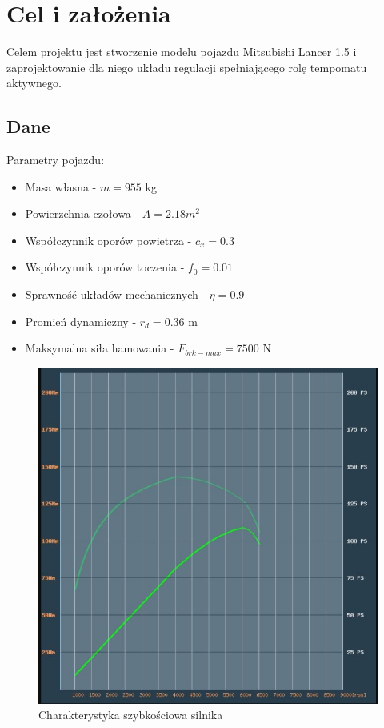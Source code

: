 \documentclass[12pt, a4paper, headings=normal]{article}
\begin{document}

\newpage

\tableofcontents

\newpage
\section{Cel i założenia}

Celem projektu jest stworzenie modelu pojazdu Mitsubishi Lancer 1.5 i zaprojektowanie 
dla niego układu regulacji spełniającego rolę tempomatu aktywnego.

\subsection{Dane}

Parametry pojazdu:
\begin{itemize}
	\item Masa własna - $m = 955$ kg
	\item Powierzchnia czołowa - $A = 2.18 m^2$
	\item Współczynnik oporów powietrza - $c_x = 0.3$
	\item Współczynnik oporów toczenia - $f_0 = 0.01$
	\item Sprawność układów mechanicznych - $\eta = 0.9$
	\item Promień dynamiczny - $r_d = 0.36$ m
	\item Maksymalna siła hamowania - $F_{brk-max} = 7500$ N
\end{itemize}


\begin{figure}[H]
	\centering
	\includegraphics[width=.8\textwidth]{trq_auto.jpg}
	\caption{Charakterystyka szybkościowa silnika \cite{autocatalog}}
	\label{fig:trq_auto}
\end{figure}
\end{document}

